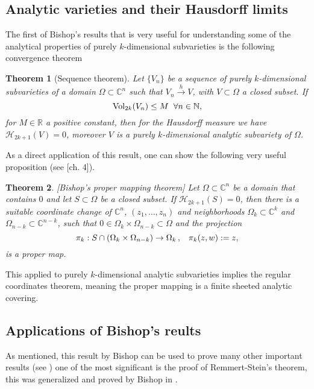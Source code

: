 \documentclass[12pt,twoside,a4paper]{report}
\newtheorem{theorem}{Theorem}[section]
\newcommand{\nat}{\ensuremath{ \mathbb N }}
\newcommand{\co}{\ensuremath{\mathbb C }}
\newcommand{\con}{\ensuremath{\mathbb{C}^n}}
\newcommand{\re}{\ensuremath{\mathbb R }}
\begin{document}
\subsection{Analytic varieties and their Hausdorff limits}
The first of Bishop's results that is very useful for understanding some of the analytical properties of purely $k$-dimensional subvarieties is the following convergence theorem
\begin{theorem}[Sequence theorem] \label{bishop sequence}Let $\lbrace
        V_n\rbrace$ be a sequence of purely $k$-dimensional subvarieties of a
        domain $\Omega\subset\con$ such that $V_n\overset{h}\rightarrow V$, with
        $V\subset\Omega$ a closed subset. If $$ \textrm{Vol}_{2k}(V_n)\leq M
        \hspace*{0.2cm}\forall n\in\nat, $$
        \noindent for $M\in\re$ a positive constant, then for the Hausdorff
        measure we have $\mathcal{H}_{2k+1}(V)=0$, moreover $V$ is a purely
        $k$-dimensional analytic subvariety of $\Omega$.
\end{theorem}
As a direct application of this result, one can show the following very useful proposition (see \cite{Stolzenberg}[ch. 4]).
\begin{theorem}\label{bishop mapping}[Bishop's proper mapping theorem] Let
        $\Omega\subset\con$ be a domain that contains $0$ and let
        $S\subset\Omega$ be a closed subset. If $\mathcal{H}_{2k+1}(S)=0$, then there
        is a suitable coordinate change of $\con$, $(z_1,\ldots,z_n)$ and
        neighborhoods $\Omega_k\subset\co^k$ and $\Omega_{n-k}\subset\co^{n-k}$, such that
        $0\in\Omega_k\times\Omega_{n-k}\subset\Omega$ and the projection
        \[
          \pi_k:S\cap(\Omega_k\times\Omega_{n-k})\rightarrow\Omega_k\, ,\hspace{0.3cm}\pi_k(z,w):=z,
        \]
        \noindent is a proper map.
\end{theorem}
\noindent This applied to purely $k$-dimensional analytic
subvarieties implies the regular coordinates theorem, meaning the proper
mapping is a finite sheeted analytic covering.

\subsection{Applications of Bishop's reults}

\noindent As mentioned, this result by Bishop can be used to prove many other important
results (see \cite{Stolzenberg}) one of the most significant is the proof of
Remmert-Stein's theorem, this was generalized and proved by Bishop in
\cite{Bishop}.
\end{document}
